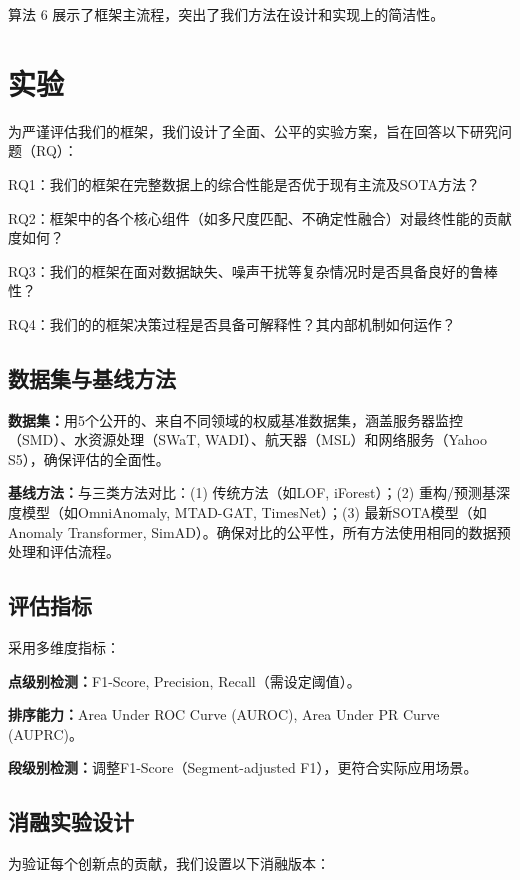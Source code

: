 \documentclass{setp-new}
\begin{document}
算法 6 展示了框架主流程，突出了我们方法在设计和实现上的简洁性。
\begin{algorithm}[H]
\caption{我们的框架主流程}
\label{alg:mdad_main}
\begin{algorithmic}[1]
\Require 

\Ensure 
\end{algorithmic}
\end{algorithm}

\section{实验}
为严谨评估我们的框架，我们设计了全面、公平的实验方案，旨在回答以下研究问题（RQ）：

RQ1：我们的框架在完整数据上的综合性能是否优于现有主流及SOTA方法？

RQ2：框架中的各个核心组件（如多尺度匹配、不确定性融合）对最终性能的贡献度如何？

RQ3：我们的框架在面对数据缺失、噪声干扰等复杂情况时是否具备良好的鲁棒性？

RQ4：我们的的框架决策过程是否具备可解释性？其内部机制如何运作？

\subsection{数据集与基线方法}
\textbf{数据集：}用5个公开的、来自不同领域的权威基准数据集，涵盖服务器监控（SMD）、水资源处理（SWaT, WADI）、航天器（MSL）和网络服务（Yahoo S5），确保评估的全面性。

\textbf{基线方法：}与三类方法对比：(1) 传统方法（如LOF, iForest）；(2) 重构/预测基深度模型（如OmniAnomaly, MTAD-GAT, TimesNet）；(3) 最新SOTA模型（如Anomaly Transformer, SimAD）。确保对比的公平性，所有方法使用相同的数据预处理和评估流程。

\subsection{评估指标}
采用多维度指标：

\textbf{点级别检测：}F1-Score, Precision, Recall（需设定阈值）。

\textbf{排序能力：}Area Under ROC Curve (AUROC), Area Under PR Curve (AUPRC)。

\textbf{段级别检测：}调整F1-Score（Segment-adjusted F1），更符合实际应用场景。


\subsection{消融实验设计}
为验证每个创新点的贡献，我们设置以下消融版本：
\end{document}
